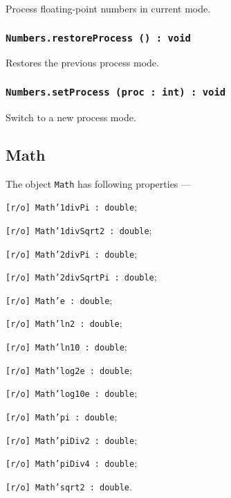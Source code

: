 Process floating-point numbers in current mode.

\subsubsection{\texttt{Numbers.restoreProcess () : void}}

Restores the previous process mode.

\subsubsection{\texttt{Numbers.setProcess (proc : int) : void}}

Switch to a new process mode.

\subsection{{\color{orange} Math}}

The object \texttt{Math} has following properties —
\begin{icItems}
	\item \texttt{[r/o] Math'1divPi : double};
	\item \texttt{[r/o] Math'1divSqrt2 : double};
	\item \texttt{[r/o] Math'2divPi : double};
	\item \texttt{[r/o] Math'2divSqrtPi : double};
	\item \texttt{[r/o] Math'e : double};
	\item \texttt{[r/o] Math'ln2 : double};
	\item \texttt{[r/o] Math'ln10 : double};
	\item \texttt{[r/o] Math'log2e : double};
	\item \texttt{[r/o] Math'log10e : double};
	\item \texttt{[r/o] Math'pi : double};
	\item \texttt{[r/o] Math'piDiv2 : double};
	\item \texttt{[r/o] Math'piDiv4 : double};
	\item \texttt{[r/o] Math'sqrt2 : double}.
\end{icItems}

